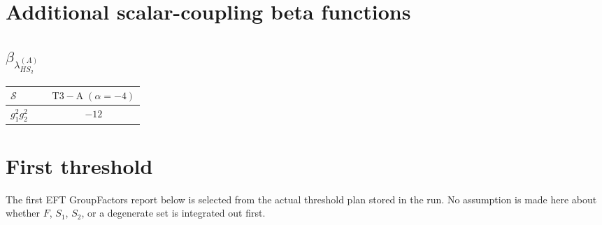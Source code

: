 \documentclass[9pt]{article}
\begin{document}
\section*{Additional scalar-coupling beta functions}
\subsection*{$ \beta_{\lambda_{HS_2}^{(A)}} $}
\begin{longtable}{@{}p{0.31\linewidth}c@{}}
\toprule
$\mathcal{S}$ & $ \mathrm{T3-A}\;(\alpha=-4) $ \\
\midrule
$ g_1^2g_2^2 $ & $ -12 $ \\
\bottomrule
\end{longtable}
\section*{First threshold}
The first EFT GroupFactors report below is selected from the actual threshold plan stored in the run.  No assumption is made here about whether $F$, $S_1$, $S_2$, or a degenerate set is integrated out first.
\end{document}
